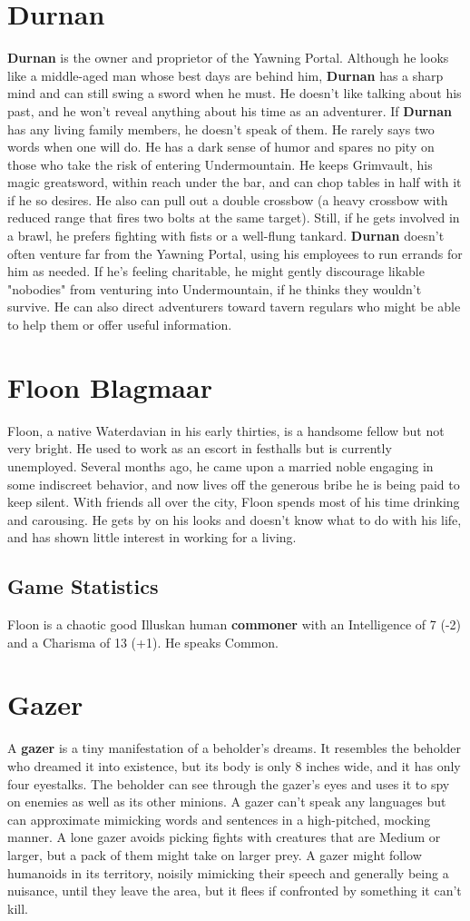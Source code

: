\documentclass[10pt,a4paper,twoside,twocolumn,openany,nodeprecatedcode]{dndbook}
\begin{document}
\section{Durnan}
\textbf{Durnan} is the owner and proprietor of the Yawning Portal. Although he looks like a middle-aged man whose best days are behind him, \textbf{Durnan} has a sharp mind and can still swing a sword when he must. He doesn't like talking about his past, and he won't reveal anything about his time as an adventurer.
If \textbf{Durnan} has any living family members, he doesn't speak of them. He rarely says two words when one will do. He has a dark sense of humor and spares no pity on those who take the risk of entering Undermountain.
He keeps Grimvault, his magic greatsword, within reach under the bar, and can chop tables in half with it if he so desires. He also can pull out a double crossbow (a heavy crossbow with reduced range that fires two bolts at the same target). Still, if he gets involved in a brawl, he prefers fighting with fists or a well-flung tankard.
\textbf{Durnan} doesn't often venture far from the Yawning Portal, using his employees to run errands for him as needed. If he's feeling charitable, he might gently discourage likable "nobodies" from venturing into Undermountain, if he thinks they wouldn't survive. He can also direct adventurers toward tavern regulars who might be able to help them or offer useful information.
\section{Floon Blagmaar}
Floon, a native Waterdavian in his early thirties, is a handsome fellow but not very bright. He used to work as an escort in festhalls but is currently unemployed. Several months ago, he came upon a married noble engaging in some indiscreet behavior, and now lives off the generous bribe he is being paid to keep silent.
With friends all over the city, Floon spends most of his time drinking and carousing. He gets by on his looks and doesn't know what to do with his life, and has shown little interest in working for a living.
\subsection{Game Statistics}
Floon is a chaotic good Illuskan human \textbf{commoner} with an Intelligence of 7 (-2) and a Charisma of 13 (+1). He speaks Common.
\section{Gazer}
A \textbf{gazer} is a tiny manifestation of a beholder's dreams. It resembles the beholder who dreamed it into existence, but its body is only 8 inches wide, and it has only four eyestalks. The beholder can see through the gazer's eyes and uses it to spy on enemies as well as its other minions.
A gazer can't speak any languages but can approximate mimicking words and sentences in a high-pitched, mocking manner. A lone gazer avoids picking fights with creatures that are Medium or larger, but a pack of them might take on larger prey.
A gazer might follow humanoids in its territory, noisily mimicking their speech and generally being a nuisance, until they leave the area, but it flees if confronted by something it can't kill.
\end{document}
